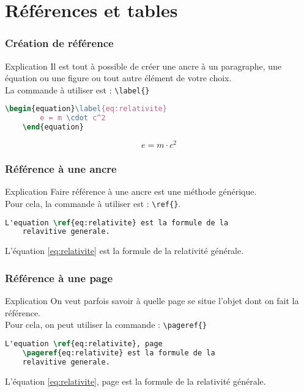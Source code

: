 \section{Références et tables}

\begin{frame}[containsverbatim]
    \frametitle{Création de référence}
    \begin{alertblock}{Explication}
        Il est tout à possible de créer une \og ancre \fg{} à un paragraphe, une équation ou une figure ou tout autre élément de votre choix. \\
        La commande à utiliser est : \verb|\label{}|
    \end{alertblock}
    \begin{lstlisting}[language=TeX, caption=Exemple]
    \begin{equation}\label{eq:relativite}
        e = m \cdot c^2
    \end{equation}
    \end{lstlisting}
    \begin{equation}\label{eq:relativite}
        e = m \cdot c^2
    \end{equation}
\end{frame}

\begin{frame}[containsverbatim]
    \frametitle{Référence à une ancre}
    \begin{alertblock}{Explication}
        Faire référence à une ancre est une méthode générique. \\
        Pour cela, la commande à utiliser est : \verb|\ref{}|.
    \end{alertblock}
    \begin{lstlisting}[language=TeX, caption=Exemple]
    L'equation \ref{eq:relativite} est la formule de la
    relavitive generale.
    \end{lstlisting}
    L'équation \ref{eq:relativite} est la formule de la relativité générale.
\end{frame}

\begin{frame}[containsverbatim]
    \frametitle{Référence à une page}
    \begin{alertblock}{Explication}
        On veut parfois savoir à quelle page se situe l'objet dont on fait la référence. \\
        Pour cela, on peut utiliser la commande : \verb|\pageref{}|
    \end{alertblock}
    \begin{lstlisting}[language=TeX, caption=Exemple]
    L'equation \ref{eq:relativite}, page
    \pageref{eq:relativite} est la formule de la 
    relavitive generale.
    \end{lstlisting}
    L'équation \ref{eq:relativite}, page \pageref{eq:relativite} est la formule de la relativité générale.
    \end{frame}

